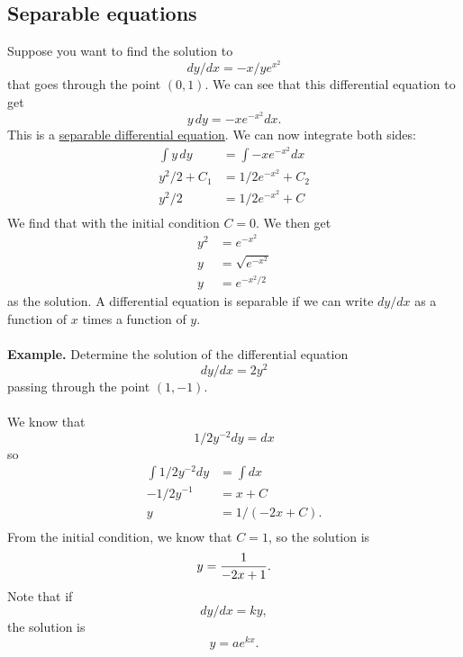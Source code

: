 \documentclass[11pt, oneside]{article}   	%
\begin{document}
\subsection{Separable equations}
Suppose you want to find the solution to 
$$
dy/dx = -x/ye^{x^2}
$$
that goes through the point $(0,1)$. We can see that this differential equation to get
$$
y\, dy = -xe^{-x^2}dx.
$$
This is a \underline{separable differential equation}. We can now integrate both sides:
\begin{align*}
\int y \,dy &= \int -xe^{-x^2}dx\\
y^2 / 2 + C_1 &= 1/2 e^{-x^2} + C_2\\
y^2/2 &= 1/2 e^{-x^2} + C\\ 
\end{align*}
We find that with the initial condition $C = 0$. We then get 
\begin{align*}
y^2 &= e^{-x^2}\\
y &= \sqrt{e^{-x^2}}\\
y &= e^{-x^2/2}
\end{align*}
as the solution. A differential equation is separable if we can write $dy/dx$ as a function of $x$ times a function of $y$. \\\\
\textbf{Example.} Determine the solution of the differential equation
$$
dy/dx = 2y^2
$$
passing through the point $(1,-1)$. \\\\
We know that 
$$
1/2y^{-2} dy = dx
$$
so
\begin{align*}
\int 1/2y^{-2}dy &= \int dx\\
-1/2y^{-1} &= x + C\\
y &= 1 / (-2x + C).\\
\end{align*}
From the initial condition, we know that $C=1$, so the solution is
$$
y = \frac{1}{-2x+1}.\\
$$
Note that if 
$$
dy/dx = ky,
$$
the solution is 
$$
y = ae^{kx}.
$$
\end{document}
